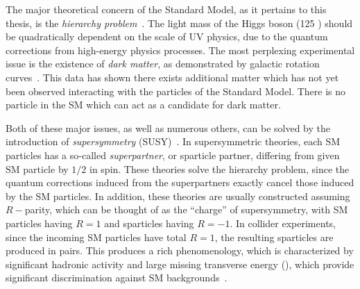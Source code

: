 The major theoretical concern of the Standard Model, as it pertains to this thesis, is the \textit{hierarchy problem}~\cite {Weinberg:1975gm,Weinberg:1979bn, Gildener:1976ai, Susskind:1978ms, susyPrimer}.
The light mass of the Higgs boson (125 \GeV) should be quadratically dependent on the scale of UV physics, due to the quantum corrections from high-energy physics processes.
The most perplexing experimental issue is the existence of \textit{dark matter}, as demonstrated by galactic rotation curves~\cite{Rubin:1970zza, Roberts:1970zza, Rubin:1980zd, Rubin:1985ze, Bosma:1981zz, Persic:1995ru, darkMatterPrimer}.
This data has shown there exists additional matter which has not yet been observed interacting with the particles of the Standard Model.
There is no particle in the SM which can act as a candidate for dark matter.

Both of these major issues, as well as numerous others, can be solved by the introduction of \textit{supersymmetry} (SUSY)~\cite{Miyazawa:1966mfa, Gervais:1971xj, Gervais:1971ji, Golfand:1971iw, Neveu:1971rx, Neveu:1971iv, Volkov:1973ix,  Wess:1973kz, Salam:1974ig, Ferrara:1974ac, Wess:1974tw, susyPrimer,Lykken:1996xt,archilSUSYLectures}.
In supersymmetric theories, each SM particles has a so-called \textit{superpartner}, or sparticle partner, differing from given SM particle by $1/2$ in spin.
These theories solve the hierarchy problem, since the quantum corrections induced from the superpartners exactly cancel those induced by the SM particles.
In addition, these theories are usually constructed assuming $R-$parity, which can be thought of as the ``charge'' of supersymmetry, with SM particles having $R=1$ and sparticles having $R=-1$.
In collider experiments, since the incoming SM particles have total $R=1$, the resulting sparticles are produced in pairs.
This produces a rich phenomenology, which is characterized by significant hadronic activity and large missing transverse energy (\met), which provide significant discrimination against SM backgrounds~\cite{Farrar:1978xj}.

